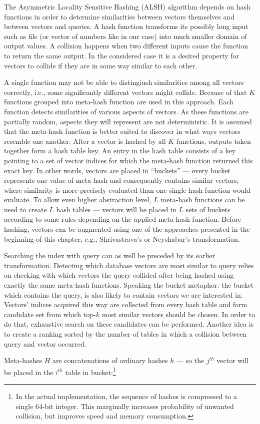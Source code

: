 The Asymmetric Locality Sensitive Hashing (ALSH) \cite{alsh} algorithm depends on hash functions
in order to determine similarities between vectors themselves and between vectors and queries.
A hash function transforms its possibly long input such as file (or vector of numbers like in our case)
into much smaller domain of output values.
A collision happens when two different inputs cause the function to return the same output.
In the considered case it is a desired property for vectors to collide if they are in some way similar to each other.

A single function may not be able to distingiush similarities among all vectors correctly, i.e., some
significantly different vectors might collide. Because of that $K$ functions grouped into
meta-hash function are used in this approach. Each function detects similarities of various aspects of vectors.
As these functions are partially random, aspects they will represent are not deterministic.
It is assumed that the meta-hash function is better suited to discover in what ways vectors
resemble one another.
After a vector is hashed by all $K$ functions, outputs taken together form a hash table key.
An entry in the hash table consists of a key pointing to a set of vector indices for which the meta-hash function
returned this exact key. In other words, vectors are placed in ``buckets'' ---
every bucket represents one value of meta-hash and consequently contains similar vectors, where
similarity is more precisely evaluated than one single hash function would evaluate.
To allow even higher abstraction level, $L$ meta-hash functions can be used to create $L$ hash tables ---
vectors will be placed in $L$ sets of buckets according to some rules depending on the applied meta-hash function.
Before hashing, vectors can be augmented using one of the approaches presented in the beginning
of this chapter, e.g., Shrivastrava's or Neyshabur's transformation. 

Searching the index with query can as well be preceded by its earlier transformation.
Detecting which database vectors are most similar to query relies on checking with which
vectors the query collided after being hashed using exactly the same meta-hash functions.
Speaking the bucket metaphor: the bucket which contains the query, is also likely to contain
vectors we are interested in.
Vectors' indices acquired this way are collected from every hash table and form candidate set from which top-$k$
most similar vectors should be chosen. In order to do that, exhaustive search on these candidates
can be performed.
Another idea is to create a ranking sorted by the number of tables in which a collision
between query and vector occurred.
\par
Meta-hashes $H$ are concatenations of ordinary hashes $h$ --- so the $j^{th}$ vector will be placed in 
the $i^{th}$ table in bucket:\footnote{
In the actual implementation, the sequence of hashes is compressed to a single 64-bit integer. This
marginally increases probability of unwanted collision, but improves speed and memory consumption.
}

